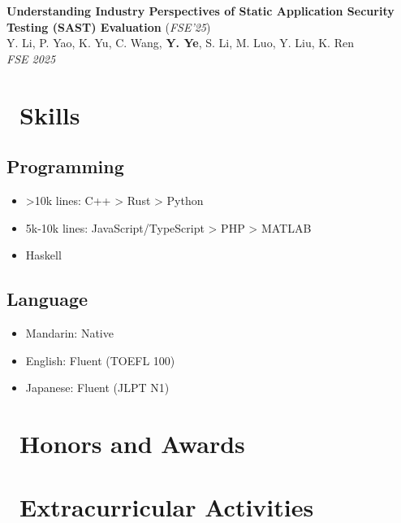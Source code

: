 \documentclass{resume}
\begin{document}
\textbf{Understanding Industry Perspectives of Static Application Security Testing (SAST) Evaluation} (\textit{FSE'25})\\
Y. Li, P. Yao, K. Yu, C. Wang, \textbf{Y. Ye}, S. Li, M. Luo, Y. Liu, K. Ren \\
\textit{FSE 2025}

\section{\faCogs\ Skills}
\subsection{\textbf{Programming}}
\begin{itemize}[itemsep=0.5ex]
  \item >10k lines: C++ > Rust > Python
  \item 5k-10k lines: JavaScript/TypeScript > PHP > MATLAB
  \item <5k lines: Java > Haskell
\end{itemize}
\subsection{\textbf{Language}}
\begin{itemize}[itemsep=0.5ex]
  \item Mandarin: Native
  \item English: Fluent (TOEFL 100)
  \item Japanese: Fluent (JLPT N1)
\end{itemize}

\section{\faHeartO\ Honors and Awards}

\section{\faInfo\ Extracurricular Activities}
\end{document}
